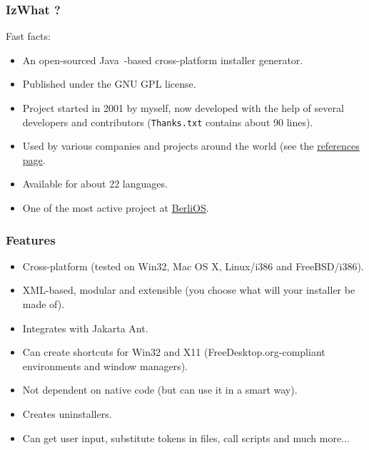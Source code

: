\documentclass[compress,10pt]{beamer}
\begin{document}
\begin{frame}

\frametitle{IzWhat ?}

Fast facts:
  \begin{itemize}
    \item An open-sourced Java\texttrademark~-based cross-platform installer
    generator.

    \item Published under the GNU GPL license.

    \item Project started in 2001 by myself, now developed with the help of
    several developers and contributors (\texttt{Thanks.txt} contains about 90
    lines).

    \item Used by various companies and projects around the world (see the
    \href{http://www.izforge.com/izpack/index.php?page=references}{references
    page}.

    \item Available for about 22 languages.

    \item One of the most active project at
    \href{http://www.berlios.de/}{BerliOS}.
  \end{itemize}

\end{frame}


\begin{frame}

\frametitle{Features}

\begin{itemize}

  \item Cross-platform (tested on Win32, Mac OS X, Linux/i386 and FreeBSD/i386).

  \item XML-based, modular and extensible (you choose what will your installer be
  made of).

  \item Integrates with Jakarta Ant.

  \item Can create shortcuts for Win32 and X11 (FreeDesktop.org-compliant
  environments and window managers).

  \item Not dependent on native code (but can use it in a smart way).

  \item Creates uninstallers.

  \item Can get user input, substitute tokens in files, call scripts and much
  more...

\end{itemize}

\end{frame}
\end{document}
